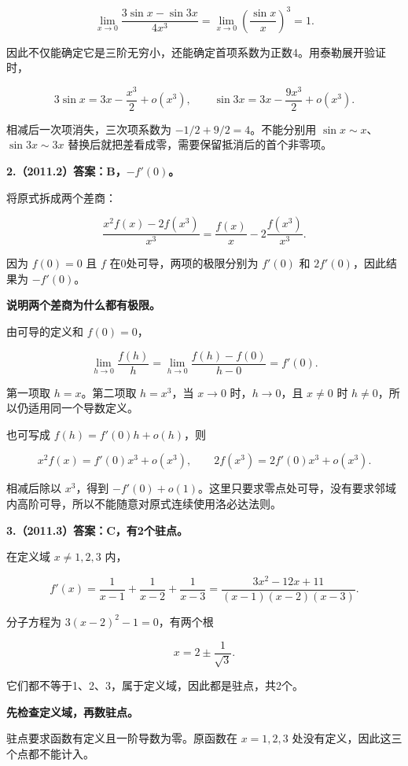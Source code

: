 \documentclass[UTF8,11pt,fontset=windows]{ctexart}
\begin{document}
$$
\lim_{x\to0}\frac{3\sin x-\sin3x}{4x^3}
=\lim_{x\to0}\left(\frac{\sin x}{x}\right)^3=1.
$$

因此不仅能确定它是三阶无穷小，还能确定首项系数为正数4。用泰勒展开验证时，

$$
3\sin x=3x-\frac{x^3}{2}+o(x^3),
\qquad\sin3x=3x-\frac{9x^3}{2}+o(x^3).
$$

相减后一次项消失，三次项系数为 $-1/2+9/2=4$。不能分别用 $\sin x\sim x$、$\sin3x\sim3x$ 替换后就把差看成零，需要保留抵消后的首个非零项。

\clearpage

\textbf{2.（2011.2）答案：B，$-f'(0)$。}

将原式拆成两个差商：

$$
\frac{x^2f(x)-2f(x^3)}{x^3}
=\frac{f(x)}x-2\frac{f(x^3)}{x^3}.
$$

因为 $f(0)=0$ 且 $f$ 在0处可导，两项的极限分别为 $f'(0)$ 和 $2f'(0)$，因此结果为 $-f'(0)$。

\textbf{说明两个差商为什么都有极限。}

由可导的定义和 $f(0)=0$，

$$
\lim_{h\to0}\frac{f(h)}h
=\lim_{h\to0}\frac{f(h)-f(0)}{h-0}=f'(0).
$$

第一项取 $h=x$。第二项取 $h=x^3$，当 $x\to0$ 时，$h\to0$，且 $x\ne0$ 时 $h\ne0$，所以仍适用同一个导数定义。

也可写成 $f(h)=f'(0)h+o(h)$，则

$$
x^2f(x)=f'(0)x^3+o(x^3),
\qquad2f(x^3)=2f'(0)x^3+o(x^3).
$$

相减后除以 $x^3$，得到 $-f'(0)+o(1)$。这里只要求零点处可导，没有要求邻域内高阶可导，所以不能随意对原式连续使用洛必达法则。

\clearpage

\textbf{3.（2011.3）答案：C，有2个驻点。}

在定义域 $x\ne1,2,3$ 内，

$$
f'(x)=\frac1{x-1}+\frac1{x-2}+\frac1{x-3}
=\frac{3x^2-12x+11}{(x-1)(x-2)(x-3)}.
$$

分子方程为 $3(x-2)^2-1=0$，有两个根

$$
x=2\pm\frac1{\sqrt3}.
$$

它们都不等于1、2、3，属于定义域，因此都是驻点，共2个。

\textbf{先检查定义域，再数驻点。}

驻点要求函数有定义且一阶导数为零。原函数在 $x=1,2,3$ 处没有定义，因此这三个点都不能计入。
\end{document}
